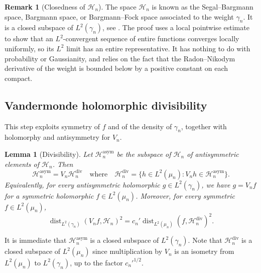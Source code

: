 \documentclass[11pt,reqno]{amsart}
\numberwithin{equation}{section}%
\numberwithin{figure}{section}%
\numberwithin{table}{section}
\theoremstyle{plain}
\newtheorem{lemma}[theorem]{Lemma}
\theoremstyle{definition}
\newtheorem{remark}[theorem]{Remark}
\begin{document}
\begin{remark}[Closedness of $\mathcal{H}_n$]
  The space $\mathcal{H}_n$ is known as the Segal--Bargmann space, Bargmann
  space, or Bargmann--Fock space associated to the weight $\gamma_n$. It is a
  closed subspace of $L^2(\gamma_n)$, see
  \cite[Prop.~14.15,~pp.~295--296]{HallQuantumTheory}. The proof uses a local
  pointwise estimate to show that an $L^2$-convergent sequence of entire
  functions converges locally uniformly, so its $L^2$ limit has an entire
  representative. It has nothing to do with probability or Gaussianity, and
  relies on the fact that the Radon--Nikodym derivative of the weight is
  bounded below by a positive constant on each compact.
\end{remark}

\subsection{Vandermonde holomorphic divisibility}

This step exploits symmetry of $f$ and of the density of $\gamma_n$, together
with holomorphy and antisymmetry for $V_n$.

\begin{lemma}[Divisibility]\label{le:divisibility}
  Let $\mathcal{H}_n^{\mathrm{asym}}$ be the subspace of $\mathcal{H}_n$ of
  antisymmetric elements of $\mathcal{H}_n$. Then
  \begin{equation}
    \mathcal{H}_n^{\mathrm{asym}}=V_n\mathcal{H}_n^{\mathrm{div}}
    \quad\text{where}\quad
    \mathcal{H}_n^{\mathrm{div}} = \{h\in
    L^2(\mu_n):V_nh\in\mathcal{H}_n^{\mathrm{asym}}\}.
  \end{equation}
  Equivalently, for every antisymmetric holomorphic $g\in L^2(\gamma_n)$, we have
  $g=V_nf$ for a symmetric holomorphic $f\in L^2(\mu_n)$. Moreover, for every
  symmetric $f\in L^2(\mu_n)$,
  \begin{equation}%
    \operatorname{dist}_{L^2(\gamma_n)}(V_nf,\mathcal{H}_n)^2
    =
    c_n'\operatorname{dist}_{L^2(\mu_n)}(f,\mathcal{H}_n^{\mathrm{div}})^2.
  \end{equation}
\end{lemma}

It is immediate that $\mathcal{H}_n^{\mathrm{asym}}$ is a closed subspace of
$L^2(\gamma_n)$. Note that $\mathcal{H}_n^{\mathrm{div}}$ is a closed subspace
of $L^2(\mu_n)$ since multiplication by $V_n$ is an isometry from $L^2(\mu_n)$
to $L^2(\gamma_n)$, up to the factor $c_n'^{1/2}$.
\end{document}
